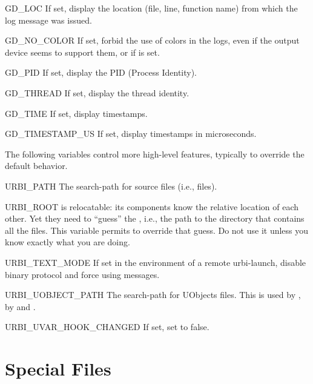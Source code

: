 \begin{envs}
\item[GD\_LOC] If set, display the location (file, line, function name) from
  which the log message was issued.

\item[GD\_NO\_COLOR] If set, forbid the use of colors in the logs, even if
  the output device seems to support them, or if  is set.

\item[GD\_PID] If set, display the PID (Process Identity).

\item[GD\_THREAD] If set, display the thread identity.

\item[GD\_TIME] If set, display timestamps.

\item[GD\_TIMESTAMP\_US] If set, display timestamps in microseconds.
\end{envs}

The following variables control more high-level features, typically to
override the default behavior.
\begin{envs}
\item[URBI\_PATH] The search-path for \us source files (i.e.,
   files).

\item[URBI\_ROOT] \usdk is relocatable: its components know
  the relative location of each other.  Yet they need to ``guess'' the
  , i.e., the path to the directory that contains all the
  files.  This variable permits to override that guess.  Do not use it
  unless you know exactly what you are doing.

\item[URBI\_TEXT\_MODE] If set in the environment of a remote urbi-launch,
  disable binary protocol and force using \us messages.

\item[URBI\_UOBJECT\_PATH] The search-path for UObjects files.
  This is used by , by
   and .

\item[URBI\_UVAR\_HOOK\_CHANGED] If set, set  to
  false.

\end{envs}

\section{Special Files}
\label{sec:tools:files}

